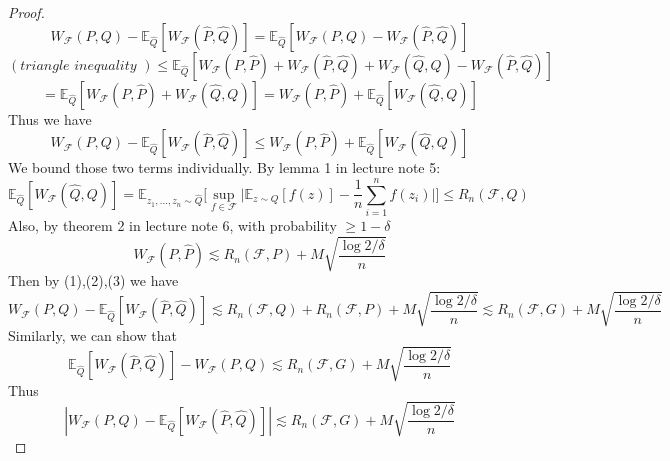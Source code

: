 \documentclass[11pt]{article}
\newcommand{\cF}{\mathcal{F}}
\begin{document}
\begin{proof}
$$W_{\cF}(P,Q)-\mathbb{E}_{\hat{Q}}[W_{\cF}(\hat{P},\hat{Q})]=\mathbb{E}_{\hat{Q}}[W_{\cF}(P,Q)-W_{\cF}(\hat{P},\hat{Q})]$$
$$(\textit{triangle inequality })\leq\mathbb{E}_{\hat{Q}}[W_{\cF}(P,\hat{P})+W_{\cF}(\hat{P},\hat{Q})+W_{\cF}(\hat{Q},Q)-W_{\cF}(\hat{P},\hat{Q})]$$
$$=\mathbb{E}_{\hat{Q}}[W_{\cF}(P,\hat{P})+W_{\cF}(\hat{Q},Q)]=W_{\cF}(P,\hat{P})+\mathbb{E}_{\hat{Q}}[W_{\cF}(\hat{Q},Q)]$$
Thus we have
\begin{equation}
W_{\cF}(P,Q)-\mathbb{E}_{\hat{Q}}[W_{\cF}(\hat{P},\hat{Q})]\leq W_{\cF}(P,\hat{P})+\mathbb{E}_{\hat{Q}}[W_{\cF}(\hat{Q},Q)]
\end{equation}
We bound those two terms individually. By lemma 1 in lecture note 5:
\begin{equation}
\mathbb{E}_{\hat{Q}}[W_{\cF}(\hat{Q},Q)]=\mathbb{E}_{z_1,...,z_n\sim\hat{Q}}\Big[\sup_{f\in\cF}\big|\mathbb{E}_{z\sim Q}[f(z)]-\frac{1}{n}\sum_{i=1}^nf(z_i)\big|\Big]\leq R_n(\cF,Q)
\end{equation}
Also, by theorem 2 in lecture note 6, with probability $\geq 1-\delta$
\begin{equation}
W_{\cF}(P,\hat{P})\lesssim R_n(\cF,P)+M\sqrt{\frac{\log2/\delta}{n}}
\end{equation}
Then by (1),(2),(3) we have
$$W_{\cF}(P,Q)-\mathbb{E}_{\hat{Q}}[W_{\cF}(\hat{P},\hat{Q})]\lesssim R_n(\cF,Q)+R_n(\cF,P)+M\sqrt{\frac{\log2/\delta}{n}}\lesssim R_n(\cF,G)+M\sqrt{\frac{\log2/\delta}{n}}$$
Similarly, we can show that
$$
\mathbb{E}_{\hat{Q}}[W_{\cF}(\hat{P},\hat{Q})]-W_{\cF}(P,Q)\lesssim R_n(\cF,G)+M\sqrt{\frac{\log2/\delta}{n}}$$
Thus
$$|W_{\cF}(P,Q)-\mathbb{E}_{\hat{Q}}[W_{\cF}(\hat{P},\hat{Q})]|\lesssim R_n(\cF,G)+M\sqrt{\frac{\log2/\delta}{n}}$$
\end{proof}
\end{document}
